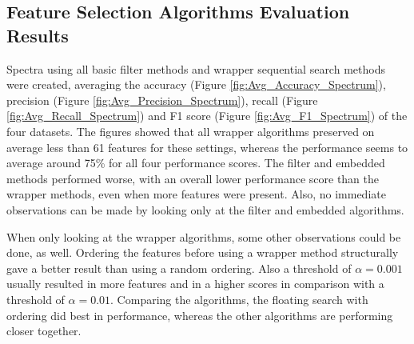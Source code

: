 \documentclass[10pt,a4paper]{article}
\begin{document}
	\subsection{Feature Selection Algorithms Evaluation Results}
	\label{subsec:FeatureSelectionAlgorithmsEvaluationResults}
	
	Spectra using all basic filter methods and wrapper sequential search methods were created, averaging the accuracy (Figure \ref{fig:Avg_Accuracy_Spectrum}), precision (Figure \ref{fig:Avg_Precision_Spectrum}), recall (Figure \ref{fig:Avg_Recall_Spectrum}) and F1 score (Figure \ref{fig:Avg_F1_Spectrum}) of the four datasets. The figures showed that all wrapper algorithms preserved on average less than 61 features for these settings, whereas the performance seems to average around 75\% for all four performance scores. The filter and embedded methods performed worse, with an overall lower performance score than the wrapper methods, even when more features were present. Also, no immediate observations can be made by looking only at the filter and embedded algorithms.
	
	When only looking at the wrapper algorithms, some other observations could be done, as well. Ordering the features before using a wrapper method structurally gave a better result than using a random ordering. Also a threshold of $\alpha = 0.001$ usually resulted in more features and in a higher scores in comparison with a threshold of $\alpha = 0.01$. Comparing the algorithms, the floating search with ordering did best in performance, whereas the other algorithms are performing closer together.
	
\end{document}
